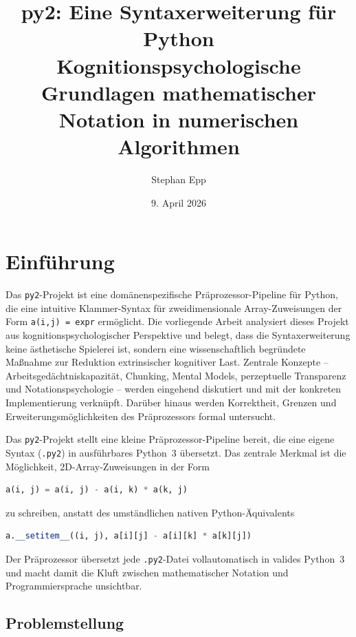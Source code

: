 ﻿\documentclass[a4paper,12pt]{article}
\title{\textbf{py2: Eine Syntaxerweiterung f\"ur Python}\\
\large Kognitionspsychologische Grundlagen mathematischer\\
Notation in numerischen Algorithmen}
\author{Stephan Epp}
\date{9. April 2026}
\theoremstyle{definition}
\begin{document}
\maketitle
\tableofcontents
\newpage

\section{Einf\"uhrung}
Das \texttt{py2}-Projekt ist eine dom\"anenspezifische Pr\"aprozessor-Pipeline f\"ur Python,
die eine intuitive Klammer-Syntax f\"ur zweidimensionale Array-Zuweisungen der Form
\texttt{a(i,j) = expr} erm\"oglicht. Die vorliegende Arbeit analysiert dieses Projekt
aus kognitionspsychologischer Perspektive und belegt, dass die Syntaxerweiterung keine
\"asthetische Spielerei ist, sondern eine wissenschaftlich begr\"undete Ma\ss{}nahme zur
Reduktion extrinsischer kognitiver Last. Zentrale Konzepte -- Arbeitsged\"achtniskapazit\"at,
Chunking, Mental Models, perzeptuelle Transparenz und Notationspsychologie -- werden
eingehend diskutiert und mit der konkreten Implementierung verkn\"upft. Dar\"uber hinaus
werden Korrektheit, Grenzen und Erweiterungsm\"oglichkeiten des Pr\"aprozessors formal
untersucht.

Das \texttt{py2}-Projekt stellt eine kleine Pr\"aprozessor-Pipeline bereit, die eine
eigene Syntax (\texttt{.py2}) in ausf\"uhrbares Python~3 \"ubersetzt. Das zentrale
Merkmal ist die M\"oglichkeit, 2D-Array-Zuweisungen in der Form

\begin{lstlisting}[language=Python, caption={py2-Syntax: mathematisch-nat\"urliche Schreibweise}]
a(i, j) = a(i, j) - a(i, k) * a(k, j)
\end{lstlisting}

zu schreiben, anstatt des umst\"andlichen nativen Python-\"Aquivalents

\begin{lstlisting}[language=Python, caption={Natives Python: strukturell fremd f\"ur Mathematiker}]
a.__setitem__((i, j), a[i][j] - a[i][k] * a[k][j])
\end{lstlisting}

Der Pr\"aprozessor \"ubersetzt jede \texttt{.py2}-Datei vollautomatisch in valides Python~3
und macht damit die Kluft zwischen mathematischer Notation und Programmiersprache unsichtbar.

\subsection{Problemstellung}
\end{document}

